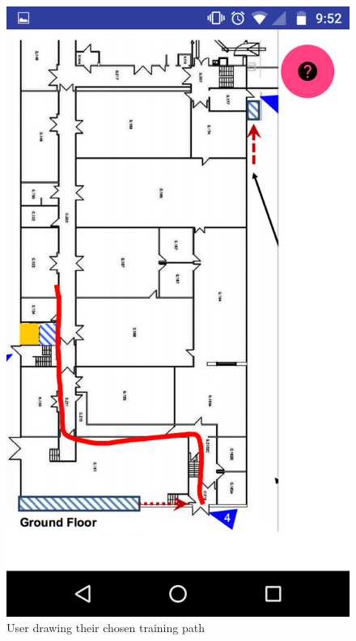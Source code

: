 \documentclass[10.8pt]{article}
\begin{document}
\begin{figure}[H]
\begin{minipage}[b]{.3\textwidth}
        \includegraphics[scale=1.2, width=\linewidth]{pic4.png}  
        \caption{User drawing their chosen training path}  
    \end{minipage} 
    \hfill
    \begin{minipage}[b]{.3\textwidth}  
        \centering  

\end{minipage}
\end{figure}
\end{document}
